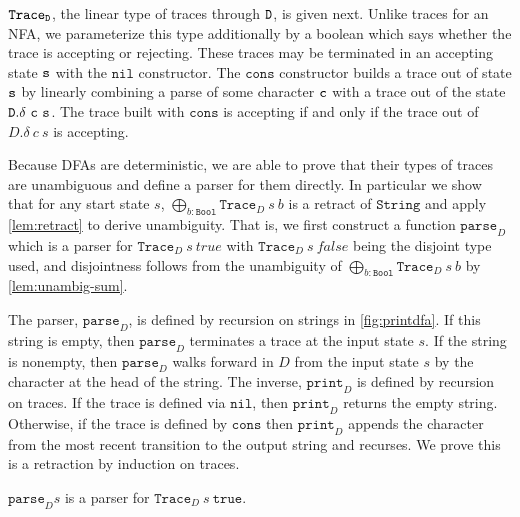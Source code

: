 \documentclass[acmsmall,nonacm]{acmart}
\newcommand{\StringGram}{\texttt{String}}
\newcommand{\Bool}{\mathtt{Bool}}
\newcommand{\true}{\mathtt{true}}
\newcommand{\nil}{\texttt{nil}}
\newcommand{\cons}{\texttt{cons}}
\newcommand{\Trace}{\texttt{Trace}}
\newcommand{\LinSigTy}[3]{\textstyle\bigoplus_{#1 : #2} #3}
\newcommand{\agdalogo}{%
  \usebox{\logoagdabox}}%
\newcommand{\zenodolink}{https://zenodo.org/records/15049780}
\newcommand{\Agda}{\href{\zenodolink}{\agdalogo}}
\newcommand{\pparse}{\mathtt{parse}}
\newcommand{\print}{\mathtt{print}}
\begin{document}
{$\Trace_{\D}$, the linear type of traces through $\texttt{D}$, is given
next. Unlike traces for an NFA, we parameterize this type additionally
by a boolean which says whether the trace is accepting or
rejecting. These traces may be terminated in an accepting state $\texttt{s}$
with the $\nil$ constructor.  The $\cons$ constructor builds a trace
out of state $\texttt{s}$ by linearly combining a parse of some character $\texttt{c}$
with a trace out of the state $\texttt{D}.\delta~\texttt{c}~\texttt{s}$. The trace built with
$\cons$ is accepting if and only if the trace out of $D.\delta~c~s$ is
accepting.

Because DFAs are deterministic, we are able to prove that their types
of traces are unambiguous and define a parser for them directly. In particular
we show that for any start state $s$, ${\LinSigTy {b} {\Bool}
  \Trace_{D}~s~b}$ is a retract of $\StringGram$ and apply \cref{lem:retract} to
derive unambiguity. That is, we first
construct a function $\pparse_{D}$ which is a parser for
$\Trace_D~{s}~{true}$ with $\Trace_D~{s}~{false}$ being the disjoint
type used, and disjointness follows from the
unambiguity of $\LinSigTy {b} {\Bool} {\Trace_{D}~s~b}$ by \cref{lem:unambig-sum}.

The parser,
$\pparse_{D}$,
is defined by recursion on strings in \cref{fig:printdfa}. If this string is empty, then $\pparse_{D}$
terminates a trace at the input state $s$. If the
string is nonempty, then $\pparse_{D}$ walks forward in $D$ from the input state $s$ by
the character at the head of the string.
%
The inverse, $\print_{D}$ is defined by recursion on traces. If the trace is defined
via $\nil$, then $\print_{D}$ returns the empty string. Otherwise, if the trace
is defined by $\cons$ then $\print_{D}$ appends the character from the most
recent transition to the output
string and recurses.
%
We prove this is a retraction by induction on traces.

\begin{theorem}[\Agda]
  \label{thm:dfa-parser}
  $\pparse_D s$ is a parser for $\Trace_D~s~\true$.
\end{theorem}

}
\end{document}
